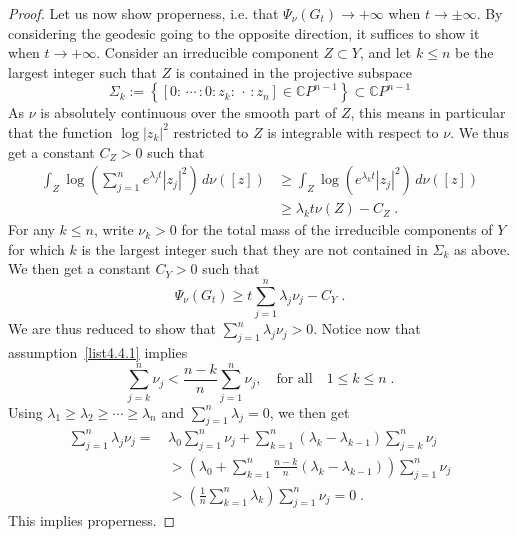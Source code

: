 \documentclass[11pt]{article}
\theoremstyle{definition}
\numberwithin{equation}{section}
\numberwithin{figure}{section}
\numberwithin{table}{section}
\newcommand{\CCC}{{\mathbb{C}}}
\renewcommand\leq {\leqslant}
\renewcommand\geq {\geqslant}
\newcommand\< {\mathcal{h}}
\renewcommand\> {\mathcal{i}}
\begin{document}
\begin{proof}
Let us now show properness, i.e. that $\Psi_\nu(G_t)\to+\infty$ when $t\to\pm\infty$. By considering the geodesic going to the opposite direction, it suffices to show it when $t\to+\infty$. Consider an irreducible component $Z\subset Y$, and let $k\leq n$ be the largest integer such that $Z$ is contained in the projective subspace
\begin{equation}\label{Sigmak}
\Sigma_k:=\left\{[0:\,\cdots\,:0:z_k:\,\cdot\,:z_n]\in\CCC P^{n-1}\right\}\subset\CCC P^{n-1}
\end{equation}
As $\nu$ is absolutely continuous over the smooth part of $Z$, this means in particular that the function $\log|z_k|^2$ restricted to $Z$ is integrable with respect to $\nu$. We thus get a constant $C_Z>0$ such that
\begin{equation}
\begin{split}
\int_Z\log\left(\sum_{j=1}^ne^{\lambda_j t} |z_j|^2\right)\,d\nu([z])&\geq\int_Z\log\left(e^{\lambda_k t} |z_j|^2\right)\,d\nu([z])\\
&\geq\lambda_k t\nu(Z)-C_Z\;.
\end{split}
\end{equation}
For any $k\leq n$, write $\nu_k>0$ for the total mass of the irreducible components of $Y$ for which $k$ is the largest integer such that they are not contained in $\Sigma_k$ as above. We then get a constant $C_Y>0$ such that
\begin{equation}
\Psi_\nu(G_t)\geq t\sum_{j=1}^n\lambda_j\nu_j-C_Y\;.
\end{equation}
We are thus reduced to show that $\sum_{j=1}^n\lambda_j\nu_j>0$. Notice now that assumption~\eqref{list4.4.1} implies
\begin{equation}
\sum_{j=k}^n\nu_j<\frac{n-k}{n}\sum_{j=1}^n\nu_j,
\quad\text{for all}\quad 1\leq k\leq n\;.
\end{equation}
Using $\lambda_1\geq\lambda_2\geq\cdots\geq\lambda_n$ and $\sum_{j=1}^n\lambda_j=0$, we then get
\begin{equation}
\begin{split}
\sum_{j=1}^n\lambda_j\nu_j=\,&\lambda_0\sum_{j=1}^n\nu_j+
\sum_{k=1}^n(\lambda_k-\lambda_{k-1})\sum_{j=k}^n\nu_j\\
&>\left(\lambda_0+\sum_{k=1}^n\frac{n-k}{n} (\lambda_k-\lambda_{k-1})\right)\sum_{j=1}^n\nu_j\\
&>\left(\frac{1}{n}
\sum_{k=1}^n\lambda_k\right)\sum_{j=1}^n\nu_j=0\;.
\end{split}
\end{equation}
This implies properness.


\end{proof}
\end{document}
